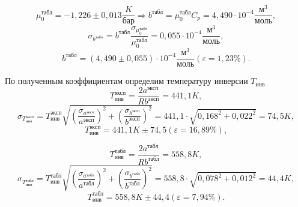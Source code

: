 \documentclass[a4paper]{article}
\begin{document}
\begin{enumerate}
\begin{equation*}
	\mu_0^{\text{табл}} = -1,226\pm 0,013 \frac{K}{\text{бар}} \Rightarrow b^{\text{табл}} = \mu_0^{\text{табл}} C_p = 4,490 \cdot 10^{-4} \frac{\text{м} ^3}{\text{моль}},
\end{equation*}
\begin{equation*}
	\sigma_{b^{\text{табл}}} = b^{\text{табл}} \frac{\sigma_{\mu_0^{\text{табл}}}}{\mu_0^{\text{табл}}} = 0,055 \cdot 10^{-4} \frac{\text{м} ^3}{\text{моль}},
\end{equation*}
\begin{equation*}
	b^{\text{табл}} = (4,490 \pm 0,055) \cdot 10^{-4} \frac{\text{м} ^3}{\text{моль}}  (\varepsilon = 1,23\%).
\end{equation*}

По полученным коэффициентам определим температуру инверсии $T_{\text{инв}}$
\begin{equation*}
	T_{\text{инв}}^{\text{эксп}} = \frac{2a^{\text{эксп}}}{Rb^{\text{эксп}}} = 441,1 K,
\end{equation*}
\begin{equation*}
	\sigma_{T_{\text{инв}}^{\text{эксп}}} = T_{\text{инв}}^{\text{эксп}}\sqrt{{(\frac{\sigma_{a^{\text{эксп}}}}{a^{\text{эксп}}})}^2 + {(\frac{\sigma_{b^{\text{эксп}}}}{b^{\text{эксп}}})}^2} = 441,1 \cdot \sqrt{{0,168}^2 + {0,022}^2} = 74,5 K,
\end{equation*}
\begin{equation*}
	T_{\text{инв}}^{\text{эксп}} = 441,1 K \pm 74,5 (\varepsilon = 16,89 \%),
\end{equation*}

\begin{equation*}
	T_{\text{инв}}^{\text{табл}} = \frac{2a^{\text{табл}}}{Rb^{\text{табл}}} = 558,8 K,
\end{equation*}
\begin{equation*}
	\sigma_{T_{\text{инв}}^{\text{табл}}} = T_{\text{инв}}^{\text{табл}}\sqrt{{(\frac{\sigma_{a^{\text{табл}}}}{a^{\text{табл}}})}^2 + {(\frac{\sigma_{b^{\text{табл}}}}{b^{\text{табл}}})}^2} = 558,8 \cdot \sqrt{{0,078}^2 + {0,012}^2} = 44,4 K,
\end{equation*}
\begin{equation*}
	T_{\text{инв}}^{\text{табл}} = 558,8 K \pm 44,4 (\varepsilon = 7,94 \%).
\end{equation*}

\end{enumerate}
\end{document}
